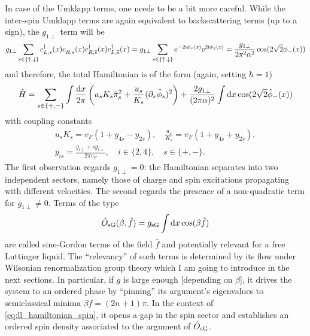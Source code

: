 In case of the Umklapp terms, one needs to be a bit more careful.
While the inter-spin Umklapp terms are again equivalent to backscattering terms (up to a sign), the $g_{1\perp}$ term will be
\begin{align}
    g_{1\perp}\sum_{s\in\{\uparrow,\downarrow\}}c^\dag_{L,s}(x)c^\pdag_{R,s}(x)c^\dag_{R,\overline s}(x)c^\dag_{L,\overline s}(x)
    =
    g_{1\perp}\sum_{s\in\{\uparrow,\downarrow\}}\re^{-2\ri\phi_s(x)}\re^{2\ri\phi_{\overline s}(x)}
    =
    \frac{g_{1\perp}}{2\pi^2\alpha^2}\cos(2\sqrt2\phi_-(x))
\end{align}
and therefore, the total Hamiltonian is of the form (again, setting $\hbar=1$)
\begin{align}
    \hat H = \sum_{s\in\{+,-\}}\int\frac{\mathrm d x}{2\pi}\left( u_s K_s\hat\pi_s^2 + \frac{u_s}{K_s}(\partial_x\hat\phi_s)^2 \right)
    +
    \frac{2g_{1\perp}}{(2\pi\alpha)^2}\int\mathrm d x\cos(2\sqrt2\hat\phi_-(x))
    \label{eq:ll_hamiltonian_spin}
\end{align}
with coupling constants
\begin{align}
    u_sK_s = v_F(1+y_{4s}-y_{2s}),
    \quad
    \frac{u_s}{K_s} = v_F(1+y_{4s}+y_{2s}),
    \\
    y_{is} = \frac{g_{i\parallel}+sg_{i\perp}}{2\pi v_F},
    \quad
    i\in\{2,4\},
    \quad
    s\in\{+,-\}.
\end{align}
The first observation regards $g_{1\perp}=0$: the Hamiltonian separates into two independent sectors, namely those of charge and spin excitations propagating with different velocities.
The second regards the presence of a non-quadratic term for $g_{1\perp}\neq0$.
Terms of the type
\begin{align}
    \hat O_{\rm sG}(\beta,\hat f) = g_{\rm sG}\int\mathrm d x\cos(\beta\hat f)
\end{align}
are called sine-Gordon terms of the field $\hat f$ and potentially relevant for a free Luttinger liquid.
The ``relevancy'' of such terms is determined by its flow under Wilsonian renormalization group theory which I am going to introduce in the next sections.
In particular, if $g$ is large enough [depending on $\beta$], it drives the system to an ordered phase by ``pinning'' its argument's eigenvalues to semiclassical minima $\beta f=(2n+1)\pi$.
In the context of \cref{eq:ll_hamiltonian_spin}, it opens a gap in the spin sector and establishes an ordered spin density associated to the argument of $\hat O_{\rm sG}$.
%
%
